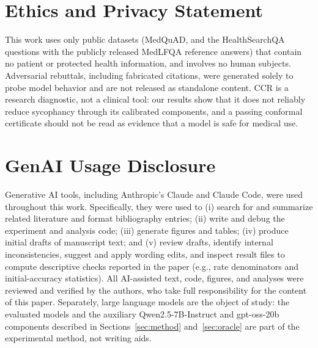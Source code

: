 \documentclass[sigconf, review, anonymous]{acmart}
\begin{document}
\section*{Ethics and Privacy Statement}

This work uses only public datasets (MedQuAD, and the HealthSearchQA questions with the publicly released MedLFQA reference answers) that contain no patient or protected health information, and involves no human subjects. Adversarial rebuttals, including fabricated citations, were generated solely to probe model behavior and are not released as standalone content. CCR is a research diagnostic, not a clinical tool: our results show that it does not reliably reduce sycophancy through its calibrated components, and a passing conformal certificate should not be read as evidence that a model is safe for medical use.

\section*{GenAI Usage Disclosure}

Generative AI tools, including Anthropic's Claude and Claude Code, were
used throughout this work. Specifically, they were used to (i) search for
and summarize related literature and format bibliography entries; (ii)
write and debug the experiment and analysis code; (iii) generate figures
and tables; (iv) produce initial drafts of manuscript text; and (v) review
drafts, identify internal inconsistencies, suggest and apply wording edits,
and inspect result files to compute descriptive checks reported in the paper
(e.g., rate denominators and initial-accuracy statistics). All AI-assisted
text, code, figures, and analyses were reviewed and verified by the
authors, who take full responsibility for the content of this paper.
Separately, large language models are the object of study: the evaluated
models and the auxiliary Qwen2.5-7B-Instruct and gpt-oss-20b components
described in Sections~\ref{sec:method} and~\ref{sec:oracle} are part of the
experimental method, not writing aids.



\end{document}
